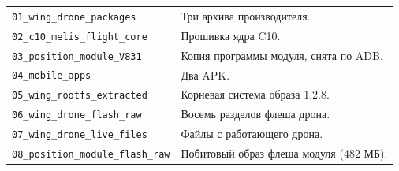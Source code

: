 \begin{tabularx}{\textwidth}{@{}p{5.6cm} Y@{}}
\toprule
{} &  \\ \midrule
\texttt{01\_wing\_drone\_packages} & Три архива производителя. \\
\texttt{02\_c10\_melis\_flight\_core} & Прошивка ядра C10. \\
\texttt{03\_position\_module\_V831} & Копия программы модуля, снята по ADB. \\
\texttt{04\_mobile\_apps} & Два APK. \\
\texttt{05\_wing\_rootfs\_extracted} & Корневая система образа 1.2.8. \\
\texttt{06\_wing\_drone\_flash\_raw} & Восемь разделов флеша дрона. \\
\texttt{07\_wing\_drone\_live\_files} & Файлы с работающего дрона. \\
\texttt{08\_position\_module\_flash\_raw} & Побитовый образ флеша модуля (482 МБ). \\ \bottomrule
\end{tabularx}
